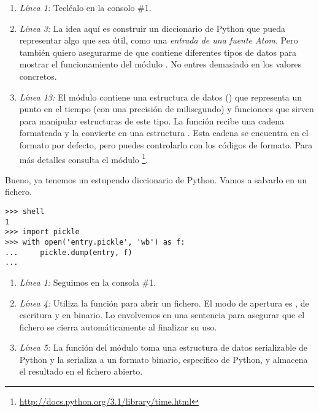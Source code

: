 \begin{enumerate}

\item \emph{Línea 1:} Tecléalo en la consolo \#1.

\item \emph{Línea 3:} La idea aquí es construir un diccionario de Python que pueda representar algo que sea útil, como una \emph{entrada de una fuente Atom}. Pero también quiero asegurarme de que contiene diferentes tipos de datos para mostrar el funcionamiento del módulo . No entres demasiado en los valores concretos.

\item \emph{Línea 13:} El módulo  contiene una estructura de datos () que representa un punto en el tiempo (con una precisión de milisegundo) y funcionees que sirven para manipular estructuras de este tipo. La función  recibe una cadena formateada y la convierte en una estructura . Esta cadena se encuentra en el formato por defecto, pero puedes controlarlo con los códigos de formato. Para más detalles consulta el módulo \footnote{\href{http://docs.python.org/3.1/library/time.html}{http://docs.python.org/3.1/library/time.html}}.

\end{enumerate}

Bueno, ya tenemos un estupendo diccionario de Python. Vamos a salvarlo en un fichero.

\noindent\begin{minipage}{\textwidth}
\begin{lstlisting}[mathescape=True]
>>> shell
1
>>> import pickle
>>> with open('entry.pickle', 'wb') as f:
...     pickle.dump(entry, f)
... 
\end{lstlisting}
\end{minipage}

\begin{enumerate}

\item \emph{Línea 1:} Seguimos en la consola \#1.

\item \emph{Línea 4:} Utiliza la función  para abrir un fichero. El modo de apertura es , de escritura y en binario. Lo envolvemos en una sentencia  para asegurar que el fichero se cierra automáticamente al finalizar su uso.

\item \emph{Línea 5:} La función  del módulo  toma una estructura de datos serializable de Python y la serializa a un formato binario, específico de Python, y almacena el resultado en el fichero abierto.

\end{enumerate}

